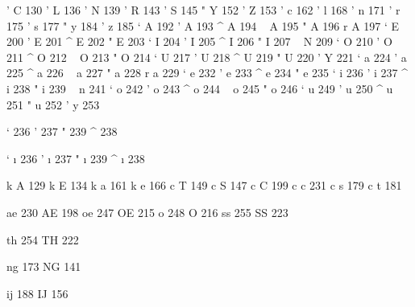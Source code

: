  ' C 130
 ' L 136
 ' N 139
 ' R 143
 ' S 145
 " Y 152
 ' Z 153
 ' c 162
 ' l 168
 ' n 171
 ' r 175
 ' s 177
 " y 184
 ' z 185
 ` A 192
 ' A 193
 ^ A 194
 ~ A 195
 " A 196
 r A 197
 ` E 200
 ' E 201
 ^ E 202
 " E 203
 ` I 204
 ' I 205
 ^ I 206
 " I 207
 ~ N 209
 ` O 210
 ' O 211
 ^ O 212
 ~ O 213
 " O 214
 ` U 217
 ' U 218
 ^ U 219
 " U 220
 ' Y 221
 ` a 224
 ' a 225
 ^ a 226
 ~ a 227
 " a 228
 r a 229
 ` e 232
 ' e 233
 ^ e 234
 " e 235
 ` i 236
 ' i 237
 ^ i 238
 " i 239
 ~ n 241
 ` o 242
 ' o 243
 ^ o 244
 ~ o 245
 " o 246
 ` u 249
 ' u 250
 ^ u 251
 " u 252
 ' y 253

 ` {\dotlessi} 236
 ' {\dotlessi} 237
 " {\dotlessi} 239
 ^ {\dotlessi} 238

 ` {\i} 236
 ' {\i} 237
 " {\i} 239
 ^ {\i} 238


 k A 129
 k E 134
 k a 161
 k e 166
 c T 149
 c S 147
 c C 199
 c c 231
 c s 179
 c t 181

 ae 230
 AE 198
 oe 247
 OE 215
 o  248
 O  216
 ss 255
 SS 223

 th 254
 TH 222

 ng 173
 NG 141

 ij 188
 IJ 156


